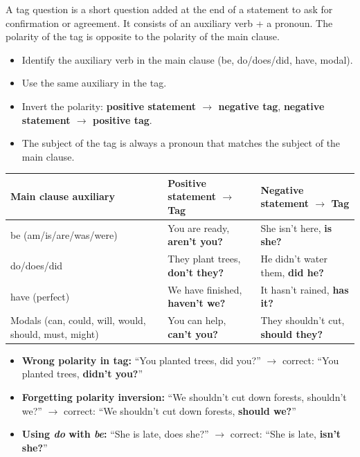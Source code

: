 \documentclass[11pt]{article}
\newcommand{\cle}[1]{{\popxbold\color{popdark}#1}}
\newcounter{popsec}
\newcounter{popsub}
\newcommand{\courssub}[1]{%
  \stepcounter{popsub}%
  \par\vspace{9pt}\noindent{\popxbold\fontsize{11.5}{13}\selectfont\color{popink}{\color{poporange}\thepopsec.\thepopsub}\hspace{6pt}#1}\par\nopagebreak\vspace{4pt}
}
\begin{document}
\courssub{Grammar: Tag questions}

\begin{definition}
A \cle{tag question} is a short question added at the end of a statement to ask for confirmation or agreement. It consists of an auxiliary verb + a pronoun. The polarity of the tag is opposite to the polarity of the main clause.
\end{definition}

\begin{propriete}
\begin{itemize}
\item Identify the auxiliary verb in the main clause (\cle{be}, \cle{do/does/did}, \cle{have}, modal).
\item Use the same auxiliary in the tag.
\item Invert the polarity: \textbf{positive statement $\rightarrow$ negative tag}, \textbf{negative statement $\rightarrow$ positive tag}.
\item The subject of the tag is always a pronoun that matches the subject of the main clause.
\end{itemize}
\end{propriete}

\begin{center}
\begin{tabularx}{\linewidth}{|l|X|X|}
\hline
\rowcolor{popblueL}
\textbf{Main clause auxiliary} & \textbf{Positive statement $\rightarrow$ Tag} & \textbf{Negative statement $\rightarrow$ Tag} \\ \hline
\cle{be} (am/is/are/was/were) & You are ready, \textbf{aren't you?} & She isn't here, \textbf{is she?} \\ \hline
\cle{do/does/did} & They plant trees, \textbf{don't they?} & He didn't water them, \textbf{did he?} \\ \hline
\cle{have} (perfect) & We have finished, \textbf{haven't we?} & It hasn't rained, \textbf{has it?} \\ \hline
Modals (can, could, will, would, should, must, might) & You can help, \textbf{can't you?} & They shouldn't cut, \textbf{should they?} \\ \hline
\end{tabularx}
\end{center}

\begin{attention}
\begin{itemize}
\item \textbf{Wrong polarity in tag:} ``You planted trees, did you?'' $\rightarrow$ correct: ``You planted trees, \textbf{didn't you?}''
\item \textbf{Forgetting polarity inversion:} ``We shouldn't cut down forests, shouldn't we?'' $\rightarrow$ correct: ``We shouldn't cut down forests, \textbf{should we?}''
\item \textbf{Using \emph{do} with \emph{be}:} ``She is late, does she?'' $\rightarrow$ correct: ``She is late, \textbf{isn't she?}''
\end{itemize}
\end{attention}
\end{document}
